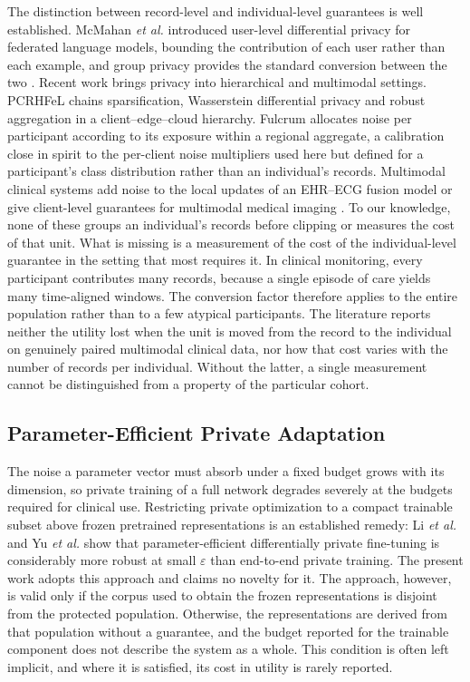 The distinction between record-level and individual-level guarantees is well
established. McMahan \emph{et al.} \cite{ref11} introduced user-level
differential privacy for federated language models, bounding the contribution
of each user rather than each example, and group privacy provides the standard
conversion between the two \cite{ref8}. Recent work brings privacy into
hierarchical and multimodal settings. PCRHFeL \cite{ref34} chains
sparsification, Wasserstein differential privacy and robust aggregation in a
client--edge--cloud hierarchy. Fulcrum \cite{ref37} allocates noise per
participant according to its exposure within a regional aggregate, a
calibration close in spirit to the per-client noise multipliers used here but
defined for a participant's class distribution rather than an individual's
records. Multimodal clinical systems add noise to the local updates of an
EHR--ECG fusion model \cite{ref35} or give client-level guarantees for
multimodal medical imaging \cite{ref36}. To our knowledge, none of these
groups an individual's records before clipping or measures the cost of that
unit. What is missing is a measurement of the
cost of the individual-level guarantee in the setting that most requires it.
In clinical monitoring, every participant contributes many records, because a
single episode of care yields many time-aligned windows. The conversion factor
therefore applies to the entire population rather than to a few atypical
participants. The literature reports neither the utility lost when the unit is
moved from the record to the individual on genuinely paired multimodal
clinical data, nor how that cost varies with the number of records per
individual. Without the latter, a single measurement cannot be distinguished
from a property of the particular cohort.

\subsection{Parameter-Efficient Private Adaptation}

The noise a parameter vector must absorb under a fixed budget grows with its
dimension, so private training of a full network degrades severely at the
budgets required for clinical use. Restricting private optimization to a
compact trainable subset above frozen pretrained representations is an
established remedy: Li \emph{et al.} \cite{ref12} and Yu \emph{et al.}
\cite{ref13} show that parameter-efficient differentially private fine-tuning
is considerably more robust at small $\varepsilon$ than end-to-end private
training. The present work adopts this approach and claims no novelty for it.
The approach, however, is valid only if the corpus used to obtain the frozen
representations is disjoint from the protected population. Otherwise, the
representations are derived from that population without a guarantee, and the
budget reported for the trainable component does not describe the system as a
whole. This condition is often left implicit, and where it is satisfied, its
cost in utility is rarely reported.

